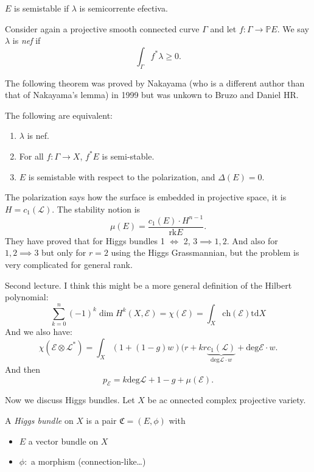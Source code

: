 \begin{theorem}
\label{theorem-semistable-nef}
$E$ is semistable if $\lambda$ is 
semicorrente efectiva.
\end{theorem}

\noindent
\begin{definition}
\label{definition-nef}
Consider again a projective smooth connected
curve $\Gamma$ and let $f:\Gamma \to \mathbb{P}E$.
We say $\lambda$ is {\it nef} if 
$$
\int_{\Gamma} f^*\lambda\geq 0.
$$
\end{definition}


\noindent
The following theorem was proved by Nakayama
(who is a different author than that of Nakayama's lemma)
in 1999 but was unkown to Bruzo and Daniel HR.
\begin{theorem}
\label{theorem-bruzzo-daniel-nakayama}
The following are equivalent:
\begin{enumerate}
\item $\lambda$ is nef.
\item For all $f:\Gamma \to X$,
$f^*E$ is semi-stable.
\item $E$ is semistable with respect to 
the polarization, and  $\Delta(E)=0$.
\end{enumerate}
\end{theorem}

The polarization says how the surface is embedded in projective space,
it is $H=c_1(\mathcal{L})$. The stability notion is
$$
\mu(E)=\frac{c_1(E)\cdot H^{n-1}}{\text{rk}E}.
$$
\medskip\noindent
They have proved that for Higgs bundles 1 $\iff$ 2, $3 \implies 1,2$.
And also for $1,2 \implies 3$ but only for $r=2$ using the Higgs Grassmannian,
but the problem is very complicated for general rank.

\medskip\noindent
Second lecture. I think this might be a more general
definition of the Hilbert polynomial:
$$
\sum_{k=0}^n(-1)^k \dim H^k(X,\mathcal{E})=\chi(\mathcal{E})
=\int_X\text{ch}(\mathcal{E})\text{td}X
$$
And we also have:
$$
\chi(\mathcal{E}\otimes \mathcal{L}^*)
=\int_X (1+(1-g)w)(r+kr
\underbrace{c_1(\mathcal{L})}_{\text{deg}\mathcal{L}\cdot w}
+\text{deg}\mathcal{E}\cdot w.
$$
And then
$$
p_{\mathcal{E}}=k \text{deg} \mathcal{L} +1-g+\mu(\mathcal{E}).
$$



\medskip\noindent
Now we discuss Higgs bundles.
Let $X$ be ac onnected complex projective variety.

\begin{definition}
\label{definition-higgs-bundle}
A {\it Higgs bundle} on $X$ 
is a pair $\mathfrak{C}=(E,\phi)$ with
\begin{itemize}
\item $E$ a vector bundle on $X$ 
\item $\phi:$ a morphism (connection-like…)
\end{itemize}
\end{definition}

